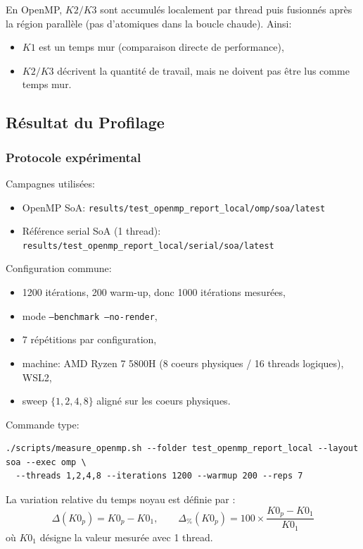 En OpenMP, \(K2/K3\) sont accumulés localement par thread puis fusionnés après la région parallèle
(pas d'atomiques dans la boucle chaude). Ainsi:
\begin{itemize}[leftmargin=*]
  \item \(K1\) est un temps mur (comparaison directe de performance),
  \item \(K2/K3\) décrivent la quantité de travail, mais ne doivent pas être lus comme temps mur.
\end{itemize}

\subsection{Résultat du Profilage}

\subsubsection{Protocole expérimental}

Campagnes utilisées:
\begin{itemize}[leftmargin=*]
  \item OpenMP SoA: \texttt{results/test\_openmp\_report\_local/omp/soa/latest}
  \item Référence serial SoA (1 thread): \texttt{results/test\_openmp\_report\_local/serial/soa/latest}
\end{itemize}

Configuration commune:
\begin{itemize}[leftmargin=*]
  \item 1200 itérations, 200 warm-up, donc 1000 itérations mesurées,
  \item mode \texttt{--benchmark --no-render},
  \item 7 répétitions par configuration,
  \item machine: AMD Ryzen 7 5800H (8 coeurs physiques / 16 threads logiques), WSL2,
  \item sweep \(\{1,2,4,8\}\) aligné sur les coeurs physiques.
\end{itemize}

Commande type:
\begin{verbatim}
./scripts/measure_openmp.sh --folder test_openmp_report_local --layout soa --exec omp \
  --threads 1,2,4,8 --iterations 1200 --warmup 200 --reps 7
\end{verbatim}

La variation relative du temps noyau est définie par :
\[
\Delta(K0_p)=K0_p-K0_1,
\qquad
\Delta_{\%}(K0_p)=100\times\frac{K0_p-K0_1}{K0_1}
\]
où \(K0_1\) désigne la valeur mesurée avec 1 thread.

